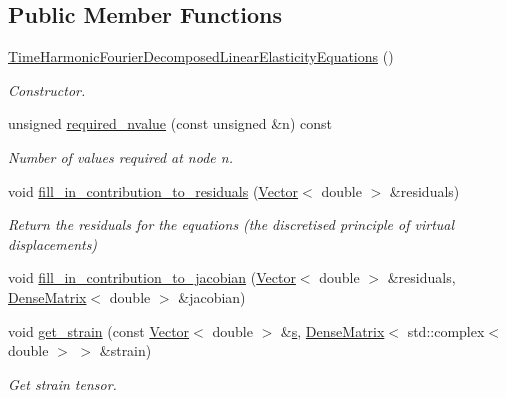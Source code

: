 \subsection*{Public Member Functions}
\begin{DoxyCompactItemize}
\item 
\hyperlink{classoomph_1_1TimeHarmonicFourierDecomposedLinearElasticityEquations_a2e154a0615ab34321abb0c6a76966cc9}{Time\+Harmonic\+Fourier\+Decomposed\+Linear\+Elasticity\+Equations} ()
\begin{DoxyCompactList}\small\item\em Constructor. \end{DoxyCompactList}\item 
unsigned \hyperlink{classoomph_1_1TimeHarmonicFourierDecomposedLinearElasticityEquations_a60b3470109b5dbfd868c1fad44b89d3e}{required\+\_\+nvalue} (const unsigned \&n) const
\begin{DoxyCompactList}\small\item\em Number of values required at node n. \end{DoxyCompactList}\item 
void \hyperlink{classoomph_1_1TimeHarmonicFourierDecomposedLinearElasticityEquations_a38dec4f82df17e0eced052a2aff8aa7c}{fill\+\_\+in\+\_\+contribution\+\_\+to\+\_\+residuals} (\hyperlink{classoomph_1_1Vector}{Vector}$<$ double $>$ \&residuals)
\begin{DoxyCompactList}\small\item\em Return the residuals for the equations (the discretised principle of virtual displacements) \end{DoxyCompactList}\item 
void \hyperlink{classoomph_1_1TimeHarmonicFourierDecomposedLinearElasticityEquations_ae5924f4e2937f652da983c47ea8f08d0}{fill\+\_\+in\+\_\+contribution\+\_\+to\+\_\+jacobian} (\hyperlink{classoomph_1_1Vector}{Vector}$<$ double $>$ \&residuals, \hyperlink{classoomph_1_1DenseMatrix}{Dense\+Matrix}$<$ double $>$ \&jacobian)
\item 
void \hyperlink{classoomph_1_1TimeHarmonicFourierDecomposedLinearElasticityEquations_aed013f2b28d4fc1b776763e75104834b}{get\+\_\+strain} (const \hyperlink{classoomph_1_1Vector}{Vector}$<$ double $>$ \&\hyperlink{cfortran_8h_ab7123126e4885ef647dd9c6e3807a21c}{s}, \hyperlink{classoomph_1_1DenseMatrix}{Dense\+Matrix}$<$ std\+::complex$<$ double $>$ $>$ \&strain)
\begin{DoxyCompactList}\small\item\em Get strain tensor. \end{DoxyCompactList}\item 

\end{DoxyCompactItemize}
